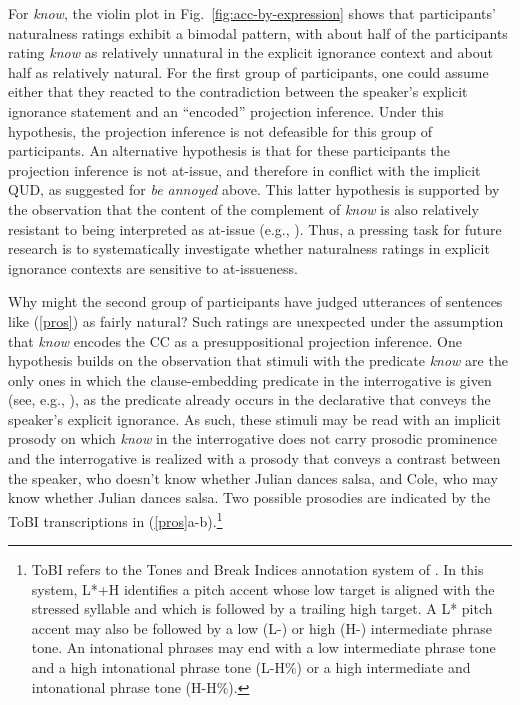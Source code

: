 \documentclass[11pt,fleqn]{article}
\newcommand{\6}{\mbox{$[\hspace*{-.6mm}[$}}
\newcommand{\9}{\mbox{$]\hspace*{-.6mm}]$}}
\begin{document}
For \emph{know}, the violin plot in Fig.~\ref{fig:acc-by-expression} shows that participants' naturalness ratings exhibit a bimodal pattern, with about half of the participants rating \emph{know} as relatively unnatural in the explicit ignorance context and about half as relatively natural. For the first group of participants, one could assume either that they reacted to the contradiction between the speaker's explicit ignorance statement and an ``encoded'' projection inference. Under this hypothesis, the projection inference is not defeasible for this group of participants. An alternative hypothesis is that for these participants the projection inference is not at-issue, and therefore in conflict with the implicit QUD, as suggested for \emph{be annoyed} above. This latter hypothesis is supported by the observation that the content of the complement of \emph{know} is also relatively resistant to being interpreted as at-issue (e.g., \citealt{simons07,tbd-variability,degen-tonhauser-glossa}). Thus, a pressing task for future research is to  systematically investigate whether naturalness ratings in explicit ignorance contexts are sensitive to at-issueness.

Why might the second group of participants have judged utterances of sentences like (\ref{pros}) as fairly natural? Such ratings are unexpected under the assumption that \emph{know} encodes the CC as a presuppositional projection inference. One hypothesis builds on the observation that stimuli with the predicate \emph{know} are the only ones in which the clause-embedding predicate in the interrogative is given (see, e.g., \citealt{schwarzschild99}), as the predicate already occurs in the declarative that conveys the speaker's explicit ignorance. As such, these stimuli may be read with an implicit prosody on which \emph{know} in the interrogative does not carry prosodic prominence and the interrogative is realized with a prosody that conveys a contrast between the speaker, who doesn't know whether Julian dances salsa, and Cole, who may know whether Julian dances salsa. Two possible prosodies are indicated by the ToBI transcriptions in (\ref{pros}a-b).\footnote{ToBI refers to the Tones and Break Indices annotation system of \citealt{beckman-ayers97}. In this system, L*+H identifies a pitch accent whose low target is aligned with the stressed syllable and which is followed by a trailing high target. A L* pitch accent may also be followed by a low (L-) or high (H-) intermediate phrase tone. An intonational phrases may end with a low intermediate phrase tone and a high intonational phrase tone (L-H\%) or a high intermediate and intonational phrase tone (H-H\%).} 
\end{document}
